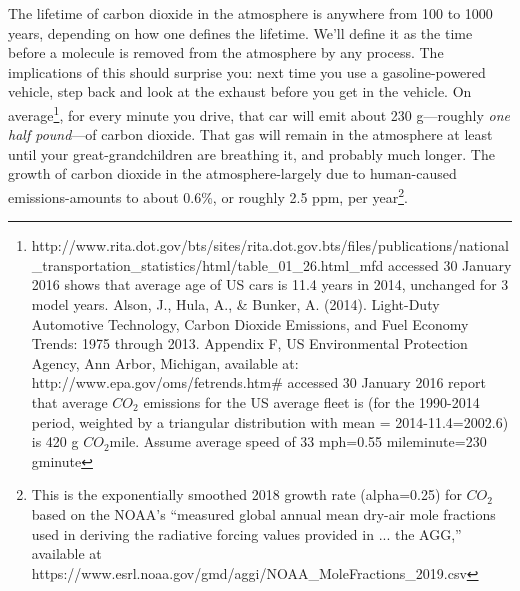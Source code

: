 The lifetime of carbon dioxide in the atmosphere is anywhere from 100 to 1000 years, depending on how one defines the lifetime. We'll define it as the time before a molecule is removed from the atmosphere by any process. The implications of this should surprise you: next time you use a gasoline-powered vehicle, step back and look at the exhaust before you get in the vehicle. On average\footnote{http://www.rita.dot.gov/bts/sites/rita.dot.gov.bts/files/publications/national\_transportation\_statistics/html/table\_01\_26.html\_mfd accessed 30 January 2016 shows that average age of US cars is 11.4 years in 2014, unchanged for 3 model years.  Alson, J., Hula, A., \& Bunker, A. (2014). Light-Duty Automotive Technology, Carbon Dioxide Emissions, and Fuel Economy Trends: 1975 through 2013. Appendix F, US Environmental Protection Agency, Ann Arbor, Michigan, available at: http://www.epa.gov/oms/fetrends.htm\# accessed 30 January 2016 report that average $CO_2$ emissions for the US average fleet is (for the 1990-2014 period, weighted by a triangular distribution with mean = 2014-11.4=2002.6) is 420 g $CO_2$\/mile. Assume average speed of 33 mph=0.55 mile\/minute=230 g\/minute}, for every minute you drive, that car will emit about 230 g---roughly \emph{one half pound}---of carbon dioxide. That gas will remain in the atmosphere at least until your great-grandchildren are breathing it, and probably much longer. The growth of carbon dioxide in the atmosphere-largely due to human-caused emissions-amounts to about 0.6\%, or roughly 2.5 ppm, per year\footnote{This is the exponentially smoothed 2018 growth rate (alpha=0.25) for $CO_2$ based on the NOAA's ``measured global annual mean dry-air mole fractions used in deriving the radiative forcing values provided in ... the AGG,'' available at https://www.esrl.noaa.gov/gmd/aggi/NOAA\_MoleFractions\_2019.csv}.\\


